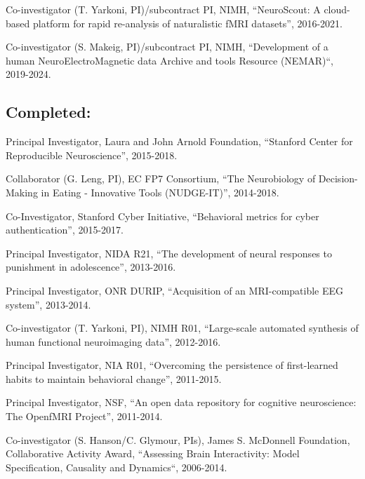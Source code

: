 \documentclass[10pt, letterpaper]{article}
\begin{document}
Co-investigator (T. Yarkoni, PI)/subcontract PI, NIMH, ``NeuroScout: A cloud-based platform for rapid re-analysis of naturalistic fMRI datasets'', 2016-2021.   \vspace{2mm}

Co-investigator (S. Makeig, PI)/subcontract PI, NIMH, ``Development of a human NeuroElectroMagnetic data Archive and tools Resource (NEMAR)``, 2019-2024.  \vspace{2mm}

\subsection*{Completed:}

Principal Investigator, Laura and John Arnold Foundation, ``Stanford Center for Reproducible Neuroscience'', 2015-2018.  \vspace{2mm}

Collaborator (G. Leng, PI), EC FP7 Consortium, ``The Neurobiology of Decision-Making in Eating - Innovative Tools (NUDGE-IT)'', 2014-2018.\vspace{2mm}

Co-Investigator, Stanford Cyber Initiative, ``Behavioral metrics for cyber authentication'',  2015-2017.  \vspace{2mm}

Principal Investigator, NIDA R21, ``The development of neural responses to punishment in adolescence'', 2013-2016.\vspace{2mm}

Principal Investigator, ONR DURIP, ``Acquisition of an MRI-compatible EEG system'', 2013-2014. \vspace{2mm}

Co-investigator (T. Yarkoni, PI), NIMH R01, ``Large-scale automated synthesis of human functional neuroimaging data'', 2012-2016. \vspace{2mm}

Principal Investigator, NIA R01, ``Overcoming the persistence of first-learned habits to maintain behavioral change'', 2011-2015. \vspace{2mm}

Principal Investigator, NSF, ``An open data repository for cognitive neuroscience: The OpenfMRI Project'', 2011-2014.   \vspace{2mm}

Co-investigator (S. Hanson/C. Glymour, PIs), James S. McDonnell Foundation, Collaborative Activity Award, ``Assessing Brain Interactivity: Model Specification, Causality and Dynamics``, 2006-2014.\vspace{2mm}
\end{document}

